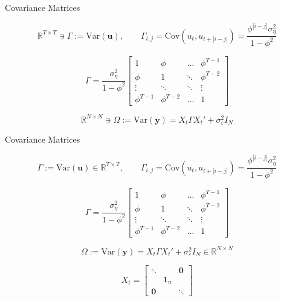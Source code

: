 \documentclass[9pt]{beamer}
\numberwithin{equation}{section}
\theoremstyle{plain}
\newcommand{\yy}{\mathbf{y}}
\newcommand{\uu}{\mathbf{u}}
\begin{document}
\begin{frame}[t]{Covariance Matrices}
    \begin{block}
        \centering
        $$    \mathbb{R}^{T\times T} \ni\Gamma := \text{Var}(\uu), \qquad \Gamma_{i,j} = \text{Cov}(u_t,u_{t+|i-j|}) = \frac{\phi^{|i-j|}\sigma_\eta^2}{1-\phi^2}$$
    \end{block}

    \begin{block}
        \centering
        $$\Gamma = \frac{\sigma_\eta^2}{1-\phi^2}\left[\begin{array}{cccc}
        1 &\phi & \dots & \phi^{T-1} \\
       \phi &  1  & \ddots & \phi^{T-2}\\
       \vdots & \ddots & \ddots & \vdots \\
       \phi^{T-1} & \phi^{T-2} & \dots & 1
    \end{array}\right]$$
    \end{block}
    \begin{block}
        \centering
        $$\mathbb{R}^{N \times N} \ni\Omega:= \text{Var}(\yy) = X_t\Gamma X_t' + \sigma_\varepsilon^2I_N$$
    \end{block}
 
\end{frame}

\begin{frame}[t]{Covariance Matrices}
    \begin{block}
        \centering
        $$    \Gamma := \text{Var}(\uu) \in \mathbb{R}^{T\times T} , \qquad \Gamma_{i,j} = \text{Cov}(u_t,u_{t+|i-j|}) = \frac{\phi^{|i-j|}\sigma_\eta^2}{1-\phi^2}$$
    \end{block}

    \begin{block}
        \centering
        $$\Gamma = \frac{\sigma_\eta^2}{1-\phi^2}\left[\begin{array}{cccc}
        1 &\phi & \dots & \phi^{T-1} \\
       \phi &  1  & \ddots & \phi^{T-2}\\
       \vdots & \ddots & \ddots & \vdots \\
       \phi^{T-1} & \phi^{T-2} & \dots & 1
    \end{array}\right]$$
    \end{block}
    \begin{block}
        \centering
        $$\Omega:= \text{Var}(\yy) = X_t\Gamma X_t' + \sigma_\varepsilon^2I_N \in \mathbb{R}^{N \times N} $$
    \end{block}
    \begin{block}
        \centering
        $$ X_t = \left[\begin{array}{ccc}
    \ddots & & \mathbf{0}  \\
     & \mathbf{1}_n & \\
     \mathbf{0} & & \ddots
\end{array}\right]$$
    \end{block}
\end{frame}
\end{document}
